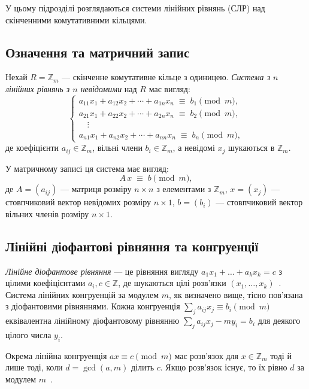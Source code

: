 У цьому підрозділі розглядаються системи лінійних рівнянь (СЛР) над скінченними комутативними кільцями.

\subsection{Означення та матричний запис}
\label{subsec:sle_definition}

Нехай \(R = \mathbb{Z}_m\) — скінченне комутативне кільце з одиницею.
\emph{Система з \(n\) лінійних рівнянь з \(n\) невідомими} над \(R\) має вигляд:
\[
    \begin{cases}
        a_{11}x_1 + a_{12}x_2 + \cdots + a_{1n}x_n \;\equiv\; b_1 \pmod{m},\\
        a_{21}x_1 + a_{22}x_2 + \cdots + a_{2n}x_n \;\equiv\; b_2 \pmod{m},\\
        \quad\vdots\\
        a_{n1}x_1 + a_{n2}x_2 + \cdots + a_{nn}x_n \;\equiv\; b_n \pmod{m},
    \end{cases}
\]
де коефіцієнти \(a_{ij} \in \mathbb{Z}_m\), вільні члени \(b_i \in \mathbb{Z}_m\), а невідомі \(x_j\) шукаються в \(\mathbb{Z}_m\).

У матричному записі ця система має вигляд:
\[
    A\,x \;\equiv\; b \pmod{m},
\]
де \(A = (a_{ij})\) — матриця розміру \(n\times n\) з елементами з \(\mathbb{Z}_m\), \(x = (x_j)\) — стовпчиковий вектор невідомих розміру \(n\times 1\), \(b = (b_i)\) — стовпчиковий вектор вільних членів розміру \(n\times 1\).

\subsection{Лінійні діофантові рівняння та конгруенції}
\label{subsec:diophantine}

\emph{Лінійне діофантове рівняння} — це рівняння вигляду \(a_1 x_1 + \dots + a_k x_k = c\) з цілими коефіцієнтами \(a_i, c \in \mathbb{Z}\), де шукаються цілі розв'язки \((x_1,\dots,x_k)\)~\cite{KameswariEtAl21}.
Система лінійних конгруенцій за модулем \(m\), як визначено вище, тісно пов'язана з діофантовими рівняннями.
Кожна конгруенція \( \sum_j a_{ij} x_j \equiv b_i \pmod{m} \) еквівалентна лінійному діофантовому рівнянню \( \sum_j a_{ij} x_j - m y_i = b_i \) для деякого цілого числа \(y_i\).

Окрема лінійна конгруенція \(a x \equiv c \pmod{m}\) має розв'язок для \(x \in \mathbb{Z}_m\) тоді й лише тоді, коли \(d = \gcd(a,m)\) ділить \(c\).
Якщо розв'язок існує, то їх рівно \(d\) за модулем \(m\)~\cite{Kryvyi21}.

